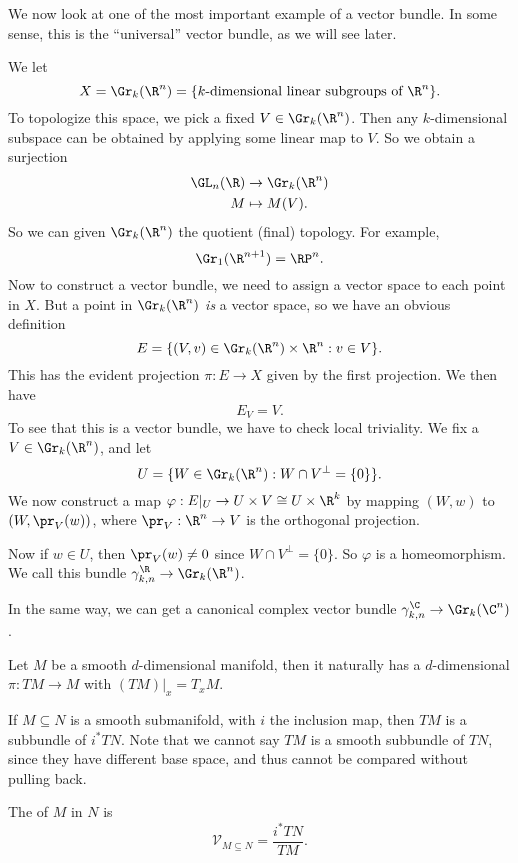 \documentclass[a4paper]{article}
\theoremstyle{definition}
\begin{document}
We now look at one of the most important example of a vector bundle. In some sense, this is the ``universal'' vector bundle, as we will see later.
\begin{eg}
  We let
  \[
    X = \Gr_k(\R^n) = \{k\text{-dimensional linear subgroups of $\R^n$}\}.
  \]
  To topologize this space, we pick a fixed $V \in \Gr_k(\R^n)$. Then any $k$-dimensional subspace can be obtained by applying some linear map to $V$. So we obtain a surjection
  \begin{align*}
    \GL_n(\R) &\to \Gr_k(\R^n)\\
    M &\mapsto M(V).
  \end{align*}
  So we can given $\Gr_k(\R^n)$ the quotient (final) topology. For example,
  \[
    \Gr_1(\R^{n + 1}) = \RP^n.
  \]
  Now to construct a vector bundle, we need to assign a vector space to each point in $X$. But a point in $\Gr_k(\R^n)$ \emph{is} a vector space, so we have an obvious definition
  \[
    E = \{(V, v) \in \Gr_k(\R^n) \times \R^n: v \in V\}.
  \]
  This has the evident projection $\pi: E \to X$ given by the first projection. We then have
  \[
    E_V = V.
  \]
  To see that this is a vector bundle, we have to check local triviality. We fix a $V \in \Gr_k(\R^n)$, and let
  \[
    U = \{W \in\Gr_k(\R^n): W \cap V^\perp = \{0\}\}.
  \]
  We now construct a map $\varphi: E|_U \to U \times V \cong U \times \R^k$ by mapping $(W, w)$ to $(W, \pr_V(w))$, where $\pr_V: \R^n \to V$ is the orthogonal projection.

  Now if $w \in U$, then $\pr_V(w) \not= 0$ since $W \cap V^\perp = \{0\}$. So $\varphi$ is a homeomorphism. We call this bundle $\gamma_{k, n}^\R \to \Gr_k(\R^n)$.

  In the same way, we can get a canonical complex vector bundle $\gamma_{k, n}^\C \to \Gr_k(\C^n)$.
\end{eg}


\begin{eg}
  Let $M$ be a smooth $d$-dimensional manifold, then it naturally has a $d$-dimensional  $\pi: TM \to M$ with $(TM)|_x = T_x M$.

  If $M \subseteq N$ is a smooth submanifold, with $i$ the inclusion map, then $TM$ is a subbundle of $i^* TN$. Note that we cannot say $TM$ is a smooth subbundle of $TN$, since they have different base space, and thus cannot be compared without pulling back.

  The  of $M$ in $N$ is
  \[
    \mathcal{V}_{M \subseteq N} = \frac{i^* TN}{TM}.
  \]
\end{eg}
\end{document}
